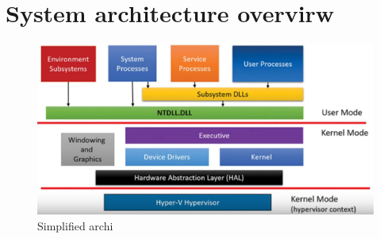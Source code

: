 \section{System architecture overvirw}

\begin{figure}[!ht]
    \includegraphics[width=\linewidth]{knowledge/internals/images/simplified-archi.png}
    \caption{Simplified archi}
    \label{fig:windows_siplified_archi}
\end{figure}

